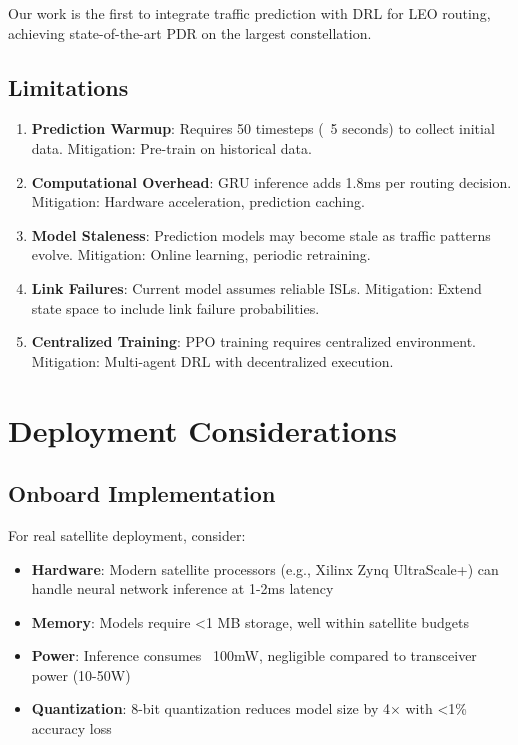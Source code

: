 Our work is the first to integrate traffic prediction with DRL for LEO routing, achieving state-of-the-art PDR on the largest constellation.

\subsection{Limitations}

\begin{enumerate}
\item \textbf{Prediction Warmup}: Requires 50 timesteps (~5 seconds) to collect initial data. Mitigation: Pre-train on historical data.

\item \textbf{Computational Overhead}: GRU inference adds 1.8ms per routing decision. Mitigation: Hardware acceleration, prediction caching.

\item \textbf{Model Staleness}: Prediction models may become stale as traffic patterns evolve. Mitigation: Online learning, periodic retraining.

\item \textbf{Link Failures}: Current model assumes reliable ISLs. Mitigation: Extend state space to include link failure probabilities.

\item \textbf{Centralized Training}: PPO training requires centralized environment. Mitigation: Multi-agent DRL with decentralized execution.
\end{enumerate}

\section{Deployment Considerations}

\subsection{Onboard Implementation}

For real satellite deployment, consider:

\begin{itemize}
\item \textbf{Hardware}: Modern satellite processors (e.g., Xilinx Zynq UltraScale+) can handle neural network inference at 1-2ms latency
\item \textbf{Memory}: Models require <1 MB storage, well within satellite budgets
\item \textbf{Power}: Inference consumes ~100mW, negligible compared to transceiver power (10-50W)
\item \textbf{Quantization}: 8-bit quantization reduces model size by 4$\times$ with <1\% accuracy loss
\end{itemize}

